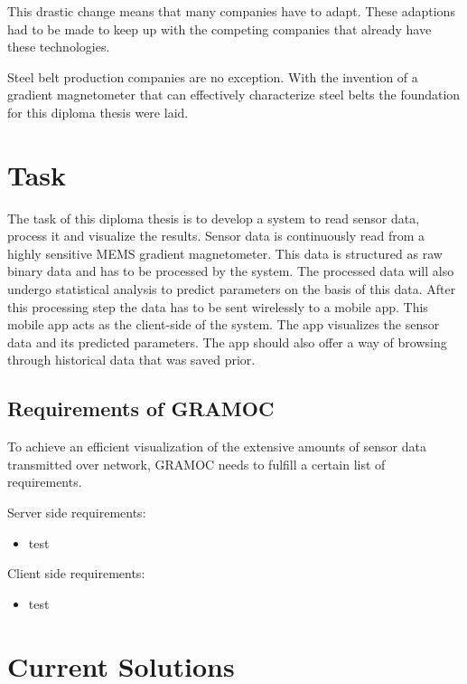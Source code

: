 This drastic change means that many companies have to adapt. These adaptions had to be made to keep up with the competing companies that already have these technologies.

Steel belt production companies are no exception. With the invention of a gradient magnetometer that can effectively characterize steel belts the foundation for this diploma thesis were laid.


\section{Task}

The task of this diploma thesis is to develop a system to read sensor data, process it and visualize the results. Sensor data is continuously read from a highly sensitive MEMS gradient magnetometer. This data is structured as raw binary data and has to be processed by the system. The processed data will also undergo statistical analysis to predict parameters on the basis of this data. After this processing step the data has to be sent wirelessly to a mobile app. This mobile app acts as the client-side of the system. The app visualizes the sensor data and its predicted parameters. The app should also offer a way of browsing through historical data that was saved prior.


\subsection{Requirements of GRAMOC}
To achieve an efficient visualization of the extensive amounts of sensor data transmitted over network, GRAMOC needs to fulfill a certain list of requirements.

Server side requirements:

\begin{itemize}
    \item test
\end{itemize}


Client side requirements:

\begin{itemize}
    \item test
\end{itemize}

\section{Current Solutions}

